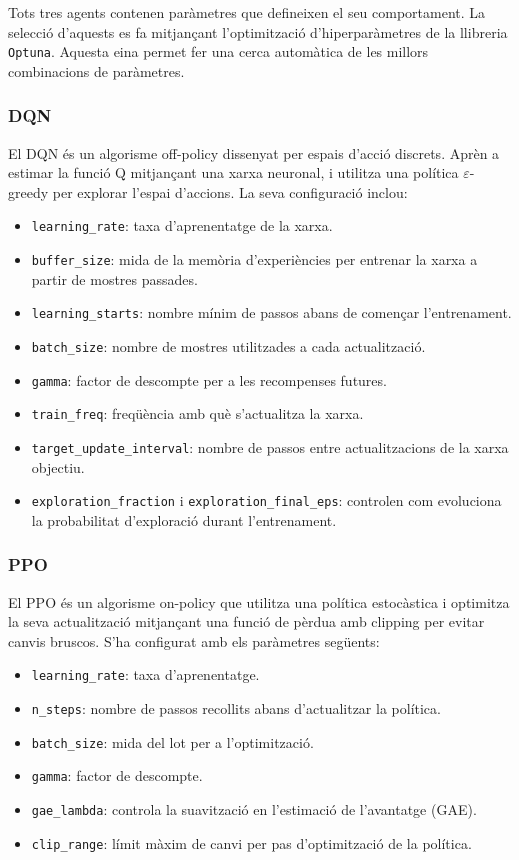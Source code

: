 \documentclass[12pt,a4paper,twoside]{book}
\begin{document}
Tots tres agents contenen paràmetres que defineixen el seu comportament. La selecció d'aquests es fa mitjançant l'optimització d'hiperparàmetres de la llibreria \texttt{Optuna}. Aquesta eina permet fer una cerca automàtica de les millors combinacions de paràmetres.

\subsubsection{DQN}

El DQN és un algorisme off-policy dissenyat per espais d'acció discrets. Aprèn a estimar la funció Q mitjançant una xarxa neuronal, i utilitza una política $\varepsilon$-greedy per explorar l'espai d'accions. La seva configuració inclou:

\begin{itemize}
    \item \texttt{learning\_rate}: taxa d'aprenentatge de la xarxa.
    \item \texttt{buffer\_size}: mida de la memòria d'experiències per entrenar la xarxa a partir de mostres passades.
    \item \texttt{learning\_starts}: nombre mínim de passos abans de començar l'entrenament.
    \item \texttt{batch\_size}: nombre de mostres utilitzades a cada actualització.
    \item \texttt{gamma}: factor de descompte per a les recompenses futures.
    \item \texttt{train\_freq}: freqüència amb què s'actualitza la xarxa.
    \item \texttt{target\_update\_interval}: nombre de passos entre actualitzacions de la xarxa objectiu.
    \item \texttt{exploration\_fraction} i \texttt{exploration\_final\_eps}: controlen com evoluciona la probabilitat d'exploració durant l'entrenament.
\end{itemize}

\subsubsection{PPO}

El PPO és un algorisme on-policy que utilitza una política estocàstica i optimitza la seva actualització mitjançant una funció de pèrdua amb clipping per evitar canvis bruscos. S'ha configurat amb els paràmetres següents:

\begin{itemize}
    \item \texttt{learning\_rate}: taxa d'aprenentatge.
    \item \texttt{n\_steps}: nombre de passos recollits abans d'actualitzar la política.
    \item \texttt{batch\_size}: mida del lot per a l'optimització.
    \item \texttt{gamma}: factor de descompte.
    \item \texttt{gae\_lambda}: controla la suavització en l'estimació de l'avantatge (GAE).
    \item \texttt{clip\_range}: límit màxim de canvi per pas d'optimització de la política.
\end{itemize}
\end{document}
